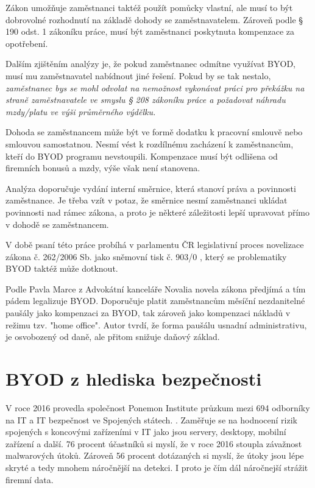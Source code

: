Zákon umožňuje zaměstnanci taktéž použít pomůcky vlastní, ale musí to být dobrovolné rozhodnutí na základě dohody se zaměstnavatelem. Zároveň podle § 190 odst. 1  zákoníku práce, musí být zaměstnanci poskytnuta kompenzace za opotřebení.

Dalším zjištěním analýzy je, že pokud zaměstnanec odmítne využívat BYOD, musí mu zaměstnavatel nabídnout jiné řešení. Pokud by se tak nestalo, \textit{zaměstnanec bys se mohl odvolat na nemožnost vykonávat práci pro překážku na straně zaměstnavatele ve smyslu § 208 zákoníku práce a požadovat náhradu mzdy/platu ve výši průměrného výdělku.}

Dohoda se zaměstnancem může být ve formě dodatku k pracovní smlouvě nebo smlouvou samostatnou. Nesmí vést k rozdílnému zacházení k zaměstnancům, kteří do BYOD programu nevstoupili. Kompenzace musí být odlišena od firemních bonusů a mzdy, výše však není stanovena. 

Analýza  doporučuje vydání interní směrnice, která stanoví práva a povinnosti zaměstnance. Je třeba vzít v potaz, že směrnice nesmí zaměstnanci ukládat povinnosti nad rámec zákona, a proto je některé záležitosti lepší upravovat přímo v dohodě se zaměstnancem.

V době psaní této práce probíhá v parlamentu ČR legislativní proces novelizace zákona č. 262/2006 Sb. jako sněmovní tisk č. 903/0 , který se problematiky BYOD taktéž může dotknout.

Podle Pavla Marce z Advokátní kanceláře Novalia  novela zákona předjímá a tím pádem legalizuje BYOD. Doporučuje platit zaměstnancům měsíční nezdanitelné paušály jako kompenzaci za BYOD, tak zároveň jako kompenzaci nákladů v režimu tzv. "home office". Autor tvrdí, že forma paušálu usnadní administrativu, je osvobozený od daně, ale přitom snižuje daňový základ. 

\section{BYOD z hlediska bezpečnosti}

V roce 2016 provedla společnost Ponemon Institute průzkum mezi 694 odborníky na IT a IT bezpečnost ve Spojených státech. . Zaměřuje se na hodnocení rizik spojených s koncovými zařízeními v IT jako jsou servery, desktopy, mobilní zařízení a další. 76 procent účastníků si myslí, že v roce 2016 stoupla závažnost malwarových útoků. Zároveň 56 procent dotázaných si myslí, že útoky jsou lépe skryté a tedy mnohem náročnější na detekci. I proto je čím dál náročnejší strážit firemní data.


